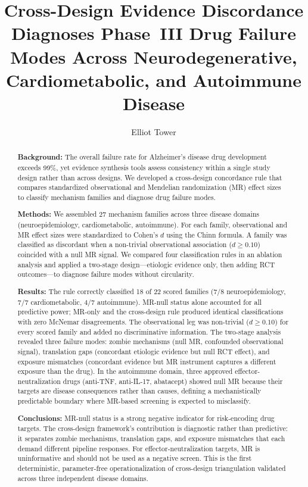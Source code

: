 \documentclass[11pt]{article}
\title{Cross-Design Evidence Discordance Diagnoses Phase~III Drug Failure Modes Across Neurodegenerative, Cardiometabolic, and Autoimmune Disease}
\author{Elliot Tower}
\affil{Independent researcher \\ \texttt{elliot@elliottower.ai}}
\date{}
\begin{document}
\maketitle

\begin{abstract}
\textbf{Background:}
The overall failure rate for Alzheimer's disease drug development exceeds 99\%, yet evidence synthesis tools assess consistency within a single study design rather than across designs. We developed a cross-design concordance rule that compares standardized observational and Mendelian randomization (MR) effect sizes to classify mechanism families and diagnose drug failure modes.

\textbf{Methods:}
We assembled 27 mechanism families across three disease domains (neuroepidemiology, cardiometabolic, autoimmune). For each family, observational and MR effect sizes were standardized to Cohen's $d$ using the Chinn formula. A family was classified as discordant when a non-trivial observational association ($d \geq 0.10$) coincided with a null MR signal. We compared four classification rules in an ablation analysis and applied a two-stage design---etiologic evidence only, then adding RCT outcomes---to diagnose failure modes without circularity.

\textbf{Results:}
The rule correctly classified 18 of 22 scored families (7/8 neuroepidemiology, 7/7 cardiometabolic, 4/7 autoimmune). MR-null status alone accounted for all predictive power; MR-only and the cross-design rule produced identical classifications with zero McNemar disagreements. The observational leg was non-trivial ($d \geq 0.10$) for every scored family and added no discriminative information. The two-stage analysis revealed three failure modes: zombie mechanisms (null MR, confounded observational signal), translation gaps (concordant etiologic evidence but null RCT effect), and exposure mismatches (concordant evidence but MR instrument captures a different exposure than the drug). In the autoimmune domain, three approved effector-neutralization drugs (anti-TNF, anti-IL-17, abatacept) showed null MR because their targets are disease consequences rather than causes, defining a mechanistically predictable boundary where MR-based screening is expected to misclassify.

\textbf{Conclusions:}
MR-null status is a strong negative indicator for risk-encoding drug targets. The cross-design framework's contribution is diagnostic rather than predictive: it separates zombie mechanisms, translation gaps, and exposure mismatches that each demand different pipeline responses. For effector-neutralization targets, MR is uninformative and should not be used as a negative screen. This is the first deterministic, parameter-free operationalization of cross-design triangulation validated across three independent disease domains.
\end{abstract}
\end{document}
